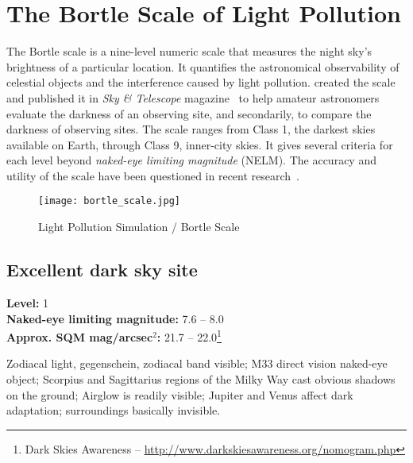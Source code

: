 
\chapter{The Bortle Scale of Light Pollution}
\label{ch:BortleScale}

The Bortle scale is a nine-level numeric scale that 
measures the night sky's brightness of a particular 
location. It quantifies the astronomical observability 
of celestial objects and the interference caused by 
light pollution.  created the 
scale and published it in \emph{Sky \& Telescope} 
magazine~\citep{Bortle} to help amateur astronomers evaluate the 
darkness of an observing site, and secondarily, 
to compare the darkness of observing sites. The 
scale ranges from Class 1, the darkest skies available 
on Earth, through Class 9, inner-city skies. 
It gives several criteria for each level beyond 
\emph{naked-eye limiting magnitude} (NELM). 
The accuracy and utility of the scale have been questioned in 
recent research~\citep{2014MNRAS.442.2600C}.

\begin{figure}[ht]\centering
\texttt{[image: bortle\_scale.jpg]}
\caption{Light Pollution Simulation / Bortle Scale}
\label{fig:BortleScale}
\end{figure}

\section{Excellent dark sky site}
\textbf{Level:} 1 \\
\textbf{Naked-eye limiting magnitude:} 7.6 -- 8.0 \\
\textbf{Approx. SQM mag/arcsec$^2$:} 21.7 -- 22.0\footnote{Dark Skies Awareness -- \url{http://www.darkskiesawareness.org/nomogram.php}}

Zodiacal light, gegenschein, zodiacal band visible; M33 direct vision
naked-eye object; Scorpius and Sagittarius regions of the Milky Way
cast obvious shadows on the ground; Airglow is readily visible;
Jupiter and Venus affect dark adaptation; surroundings basically
invisible.

